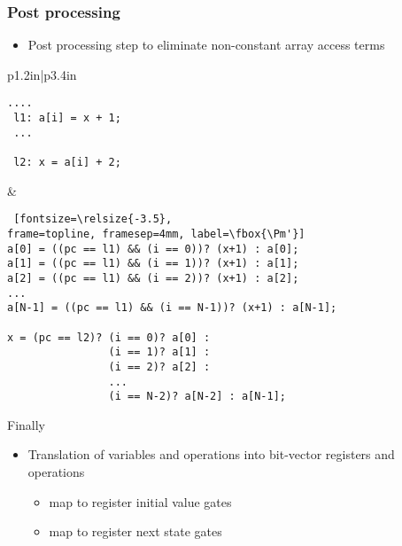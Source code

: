 \begin{frame}[containsverbatim]
\frametitle{Post processing}
\begin{itemize}
 \item Post processing step to eliminate non-constant array access terms
\end{itemize}
  \begin{tabular}{p{1.2in}|p{3.4in}}
\begin{Verbatim}[fontsize=\relsize{-3.5}, 
frame=topline, framesep=4mm, label=\fbox{\Pm}]
 ....
 l1: a[i] = x + 1;
 ...
 
 l2: x = a[i] + 2;
\end{Verbatim}
& 
\begin{Verbatim} [fontsize=\relsize{-3.5},
frame=topline, framesep=4mm, label=\fbox{\Pm'}]
a[0] = ((pc == l1) && (i == 0))? (x+1) : a[0];
a[1] = ((pc == l1) && (i == 1))? (x+1) : a[1];
a[2] = ((pc == l1) && (i == 2))? (x+1) : a[2];
...
a[N-1] = ((pc == l1) && (i == N-1))? (x+1) : a[N-1];

x = (pc == l2)? (i == 0)? a[0] :
                (i == 1)? a[1] :
                (i == 2)? a[2] :
                ...
                (i == N-2)? a[N-2] : a[N-1];
\end{Verbatim}
\end{tabular}
\end{frame}

\begin{frame}{Finally }
\begin{itemize}
 \item Translation of variables and operations into bit-vector registers and operations
   \begin{itemize}
     \item {} map to register initial value gates
     \item {} map to register next state gates
\end{itemize}
\end{itemize}
\end{frame}

